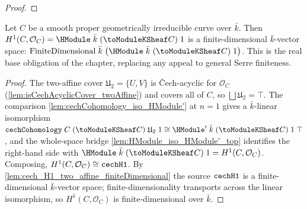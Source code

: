 \begin{proof}
\end{proof}

\begin{lemma}
  \label{lem:HModule_structureSheaf_H1_finite}
  Let \(C\) be a smooth proper geometrically irreducible curve over
  \(\bar k\). Then \(H^1(C, \mathcal O_C) =
  \HModule\;\bar k\;(\toModuleKSheaf C)\;1\) is a finite-dimensional
  \(\bar k\)-vector space:
  \(\FiniteDimensional\;\bar k\;\bigl(\HModule\;\bar k\;
  (\toModuleKSheaf C)\;1\bigr)\). This is the real base obligation of
  the chapter, replacing any appeal to general Serre finiteness.
\end{lemma}

\begin{proof}
  The two-affine cover \(\mathfrak U_2 = \{U, V\}\) is Čech-acyclic for
  \(\mathcal O_C\) (\cref{lem:isCechAcyclicCover_twoAffine}) and covers
  all of \(C\), so \(\bigsqcup \mathfrak U_2 = \top\). The comparison
  \cref{lem:cechCohomology_iso_HModule'} at \(n = 1\) gives a
  \(\bar k\)-linear isomorphism
  \(\mathtt{cechCohomology}\;C\;(\toModuleKSheaf C)\;\mathfrak U_2\;1
  \cong \HModule'\;\bar k\;(\toModuleKSheaf C)\;1\;\top\), and the
  whole-space bridge \cref{lem:HModule_iso_HModule'_top} identifies the
  right-hand side with
  \(\HModule\;\bar k\;(\toModuleKSheaf C)\;1 = H^1(C, \mathcal O_C)\).
  Composing, \(H^1(C, \mathcal O_C) \cong \mathtt{cechH1}\). By
  \cref{lem:cech_H1_two_affine_finiteDimensional} the source \(\mathtt{cechH1}\)
  is a finite-dimensional \(\bar k\)-vector space; finite-dimensionality
  transports across the linear isomorphism, so \(H^1(C, \mathcal O_C)\)
  is finite-dimensional over \(\bar k\).
\end{proof}

